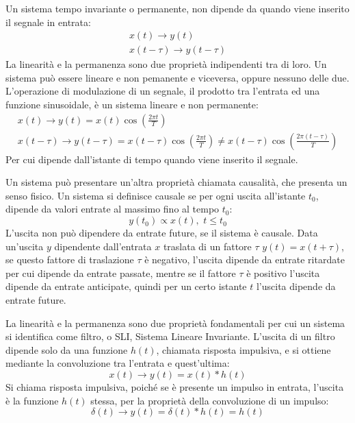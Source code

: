 \documentclass{article}
\numberwithin{equation}{subsection}
\begin{document}
Un sistema tempo invariante o permanente, non dipende da quando viene inserito il segnale in entrata:
\begin{gather*}
    x(t)\to y(t)\\
    x(t-\tau)\to y(t-\tau)
\end{gather*}
La linearità e la permanenza sono due proprietà indipendenti tra di loro. Un sistema può essere lineare e non pemanente e viceversa, oppure nessuno delle due. 
L'operazione di modulazione di un segnale, il prodotto tra l'entrata ed una funzione sinusoidale, è un sistema lineare e non permanente:
\begin{gather*}
    x(t)\to y(t)=x(t)\cos\displaystyle\left(\frac{2\pi t}{T}\right)\\
    x(t-\tau)\to y(t-\tau)=x(t-\tau)\displaystyle\cos\left(\frac{2\pi t}{T}\right)\neq x(t-\tau)\cos\left(\frac{2\pi (t-\tau)}{T}\right)
\end{gather*}
Per cui dipende dall'istante di tempo quando viene inserito il segnale. 


Un sistema può presentare un'altra proprietà chiamata causalità, che presenta un senso fisico. Un sistema si definisce causale se per ogni uscita all'istante $t_0$, dipende 
da valori entrate al massimo fino al tempo $t_0$: 
\begin{equation*}
    y(t_0)\propto x(t),\,\,t\leq t_0
\end{equation*}
L'uscita non può dipendere da entrate future, se il sistema è causale.
Data un'uscita $y$ dipendente dall'entrata $x$ traslata di un fattore $\tau$ $y(t)=x(t+\tau)$, se questo fattore di traslazione $\tau$ è negativo, l'uscita dipende da entrate ritardate 
per cui dipende da entrate passate, mentre se il fattore $\tau$ è positivo l'uscita dipende da entrate anticipate, quindi per un certo istante $t$ l'uscita dipende da entrate 
future. 


La linearità e la permanenza sono due proprietà fondamentali per cui un sistema si identifica come filtro, o SLI, Sistema Lineare Invariante. L'uscita di un filtro dipende 
solo da una funzione $h(t)$, chiamata risposta impulsiva, e si ottiene mediante la convoluzione tra l'entrata e quest'ultima:
\begin{equation*}
    x(t)\to y(t)=x(t)*h(t)
\end{equation*}
Si chiama risposta impulsiva, poiché se è presente un impulso in entrata, l'uscita è la funzione $h(t)$ stessa, per la proprietà della convoluzione di un impulso:
\begin{equation*}
    \delta(t)\to y(t)=\delta(t)*h(t)=h(t)
\end{equation*}
\end{document}
